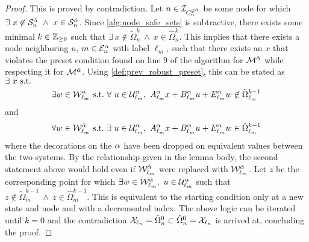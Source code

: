\begin{proof}
This is proved by contradiction. Let $n\in\idxset{\gnumnodes[\tilde\agentidx]}$ be some node for which $\exists\ x\not\in\mathcal{S}_n^{\tilde{\agentidx}}\ \land\ x\in\mathcal{S}_n^{\hat{\agentidx}}$. Since \autoref{alg:node_safe_sets} is subtractive, there exists some minimal $k\in\mathbb{Z}_{\geq 0}$ such that $\exists\ x\not\in\tilde\Omega^k_{n}\ \land\ x\in\hat\Omega^k_{n}$. This implies that there exists a node neighboring $n$, $m\in\gnodeedges[\agentidx]{n}$ with label $\ell_m$, such that there exists an $x$ that violates the preset condition found on line 9 of the algorithm for  $\mathcal{M}^{\tilde{\alpha}}$ while respecting it for  $\mathcal{M}^{\hat{\alpha}}$.  Using \autoref{def:prev_robust_preset}, this can be stated as $\exists\ x\ \st${\small
\begin{align*}
\exists w\in\wcon[{\ell_m}]^{\tilde{\agentidx}}\ \st\ \forall\ u\in\ucon[{\ell_m}]^\agentidx,\ A_{\ell_m}^\agentidx x+B_{\ell_m}^\agentidx u + E_{\ell_m}^\agentidx w \not\in \tilde\Omega^{k-1}_{{\ell_m}}
\end{align*}}
and{\small
\begin{align*}
\forall w\in\wcon[{\ell_m}]^{\hat{\agentidx}}\ \st\ \exists\ u\in\ucon[{\ell_m}]^\agentidx,\ A_{\ell_m}^\agentidx x+B_{\ell_m}^\agentidx u + E_{\ell_m}^\agentidx w \in \hat\Omega^{k-1}_{{\ell_m}}
\end{align*}}
where the decorations on the $\alpha$ have been dropped on equivalent values between the two systems. By the relationship given in the lemma body, the second statement above would hold even if $\wcon[{\ell_m}]^{\hat{\agentidx}}$ were replaced with $\wcon[{\ell_m}]^{\tilde{\agentidx}}$. Let $z$ be the corresponding point for which $\exists w\in\wcon[{\ell_m}]^{\tilde{\agentidx}},\ u\in\ucon[{\ell_m}]^\agentidx$ such that $z\not\in\tilde\Omega^{k-1}_{m}\ \land\ z\in\hat\Omega^{k-1}_{m}$. This is equivalent to the starting condition only at a new state and node and with a decremented index. The above logic can be iterated until $k=0$ and the contradiction $\xcon[\ell_n] = \tilde\Omega^0_{n}\subset\hat{\Omega}^0_{n}=\xcon[\ell_n]$ is arrived at, concluding the proof. 
\end{proof}

